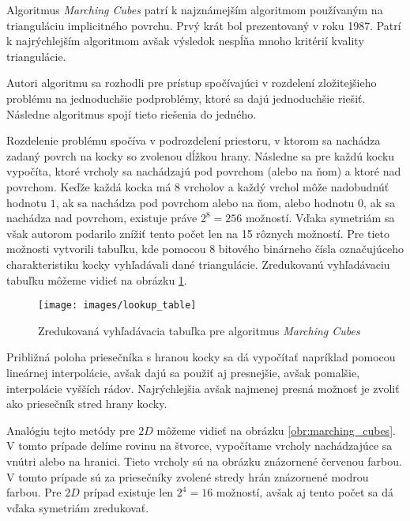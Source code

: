 Algoritmus \textit{Marching Cubes} \cite{lorensen1987marching} patrí k najznámejším algoritmom používaným
na trianguláciu implicitného povrchu. Prvý krát bol prezentovaný v roku 1987. Patrí k najrýchlejším
algoritmom avšak výsledok nespĺňa mnoho kritérií kvality triangulácie. 

Autori algoritmu sa rozhodli pre prístup spočívajúci v rozdelení zložitejšieho problému na 
jednoduchšie podproblémy, ktoré sa dajú jednoduchšie riešiť. Následne algoritmus 
spojí tieto riešenia do jedného.

Rozdelenie problému spočíva v podrozdelení priestoru, v ktorom sa nachádza zadaný povrch na kocky 
so zvolenou dĺžkou hrany. 
Následne sa pre každú kocku vypočíta, ktoré vrcholy sa nachádzajú pod povrchom (alebo na ňom) 
a ktoré nad povrchom. Keďže každá kocka má 8 vrcholov a každý vrchol môže nadobudnúť hodnotu $1$, ak sa 
nachádza pod povrchom alebo na ňom, alebo hodnotu $0$, ak sa nachádza nad povrchom, existuje práve 
$2^8 = 256$ možností. Vďaka symetriám sa však autorom podarilo znížiť tento počet len na 15 rôznych možností.
Pre tieto možnosti vytvorili tabuľku, kde pomocou 8 bitového binárneho čísla označujúceho charakteristiku
kocky vyhľadávali dané triangulácie. Zredukovanú vyhľadávaciu tabuľku môžeme vidieť na obrázku \ref{obr:lookup_table}.

\begin{figure}
    \centerline{\texttt{[image: images/lookup\_table]}}
    \caption[Zredukovaná vyhľadávacia tabuľka pre algoritmus Marching Cubes]
    {Zredukovaná vyhľadávacia tabuľka \cite{smistad2012real} pre algoritmus \textit{Marching Cubes}}
    \label{obr:lookup_table}
\end{figure}

Približná poloha priesečníka s hranou kocky sa dá vypočítať napríklad pomocou lineárnej interpolácie, avšak 
dajú sa použiť aj presnejšie, avšak pomalšie, interpolácie vyšších rádov. Najrýchlejšia avšak najmenej presná
možnosť je zvoliť ako priesečník stred hrany kocky.

Analógiu tejto metódy pre $2D$ môžeme vidieť na obrázku \ref{obr:marching_cubes}. V tomto prípade delíme rovinu na štvorce, 
vypočítame vrcholy nachádzajúce sa vnútri alebo na hranici. Tieto vrcholy sú na obrázku znázornené 
červenou farbou. V tomto prípade sú za priesečníky zvolené stredy hrán znázornené modrou farbou. 
Pre $2D$ prípad existuje len $2^4 = 16$ možností, avšak aj tento počet sa dá vďaka symetriám zredukovať.


